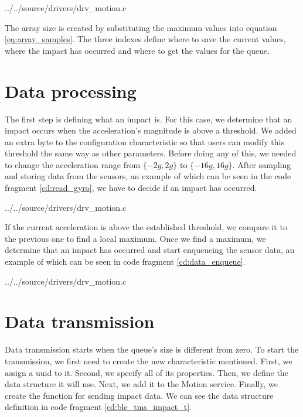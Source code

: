 
{../../source/drivers/drv_motion.c}

The array size is created by substituting the maximum values into equation \ref{eq:array_samples}. The three indexes define where to save the current values, where the impact has occurred and where to get the values for the queue.

\section{Data processing}
The first step is defining what an impact is. For this case, we determine that an impact occurs when the acceleration's magnitude is above a threshold. We added an extra byte to the configuration characteristic so that users can modify this threshold the same way as other parameters. Before doing any of this, we needed to change the acceleration range from  $\{-2g, 2g\}$ to $\{-16g, 16g\}$. After sampling and storing data from the sensors, an example of which can be seen in the code fragment \ref{cd:read_gyro}, we have to decide if an impact has occurred.


{../../source/drivers/drv_motion.c}

If the current acceleration is above the established threshold, we compare it to the previous one to find a local maximum. Once we find a maximum, we determine that an impact has occurred and start enqueueing the sensor data, an example of which can be seen in code fragment \ref{cd:data_enqueue}.


{../../source/drivers/drv_motion.c}

\section{Data transmission}

Data transmission starts when the queue's size is different from zero. To start the transmission, we first need to create the new characteristic mentioned. First, we assign a \gls{uuid} to it. Second, we specify all of its properties. Then, we define the data structure it will use. Next, we add it to the Motion service. Finally, we create the function for sending impact data. We can see the data structure definition in code fragment \ref{cd:ble_tms_impact_t}. 

